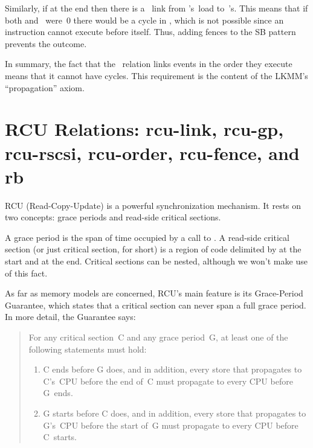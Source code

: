 Similarly, if  at the end then there is a ~link from
's~load to~'s.
This means that if both  and~ were~0 there would be a
cycle in , which is not possible since an instruction cannot execute
before itself.
Thus, adding  fences to the SB pattern prevents
the  outcome.

In summary, the fact that the ~relation links events in the order
they execute means that it cannot have cycles.
This requirement is the content of the LKMM's ``propagation'' axiom.


\section{RCU Relations: rcu-link, rcu-gp, rcu-rscsi, rcu-order, rcu-fence, and rb}
\label{sec:docs:explanation:RCU Relations: rcu-link, rcu-gp, rcu-rscsi, rcu-order, rcu-fence, and rb}

RCU (Read-Copy-Update) is a powerful synchronization mechanism.
It rests on two concepts: grace periods and read-side critical sections.

A grace period is the span of time occupied by a call to
.
A read-side critical section (or just critical section, for short) is
a region of code delimited by  at the start and
 at the end.
Critical sections can be nested, although we won't make use of this fact.

As far as memory models are concerned, RCU's main feature is its
Grace-Period Guarantee, which states that a critical section can never
span a full grace period.
In more detail, the Guarantee says:

\begin{quote}
  For any critical section~C and any grace period~G, at least one of
  the following statements must hold:

  \begin{enumerate}
  \item	C ends before G does, and in addition, every store that
	propagates to C's~CPU before the end of~C must propagate to
	every CPU before G~ends.

  \item	G starts before C does, and in addition, every store that
	propagates to G's~CPU before the start of~G must propagate
	to every CPU before C~starts.
  \end{enumerate}
\end{quote}

